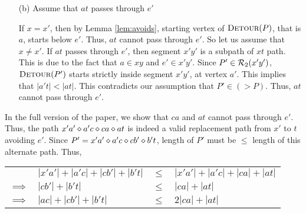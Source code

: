 \begin{enumerate}
  \item[(b)] Assume that $at$ passes through $e'$ %
  \label{enum:one}

  If $x = x'$, then by Lemma \ref{lem:avoids}, starting vertex of $\textsc{Detour}(P)$, that is $a$, starts below $e'$. Thus,
  $at$ cannot pass through $e'$. So let us assume that $x \neq x'$.
  If $at$ passes through $e'$, then segment $x'y'$ is a subpath of $xt$ path.
  This is due to the fact that $a \in xy$ and $e' \in x'y'$. Since $P' \in \mathcal{R}_2(x'y')$,
  $\textsc{Detour}(P')$ starts strictly inside segment $x'y'$, at vertex $a'$. This implies that $|a't| < |at|$.
  This contradicts our assumption that $P' \in (>P)$. Thus, $at$ cannot pass through $e'$.




  \end{enumerate}
\fi



\iflong\else In the full version of the paper, we show that $ca$ and $at$ cannot pass through $e'$. \fi
Thus, the path $x'a' \diamond a'c \diamond ca \diamond at$ is indeed a valid replacement
path from $x'$ to $t$ avoiding $e'$. Since $P' = x'a' \diamond a'c \diamond cb' \diamond b't$, length
of $P'$ must be $\le$ length of  this alternate path. Thus,\\
\begin{tabular}{llll}
& $|x'a'| +  |a'c|
+ |cb'| + |b't|$& $\le$ & $|x'a'| + |a'c| + |ca|  + |at|$  \\
$\implies$& $
|cb'| + |b't|$ & $\le$ & $|ca|  + |at|$   \\
$\implies$&$|ac| +
|cb'| + |b't|$ & $\le$ &  $2|ca|  + |at|$

\end{tabular}
%

